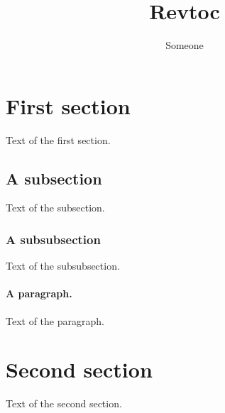 \documentclass{revtex4}
\begin{document}
\title{Revtoc}
\author{Someone}
\maketitle
\section{First section}
Text of the first section.
\subsection{A subsection}
Text of the subsection.
\subsubsection{A subsubsection}
Text of the subsubsection.
\paragraph{A paragraph.}
Text of the paragraph.
\section{Second section}
Text of the second section.
\end{document}
